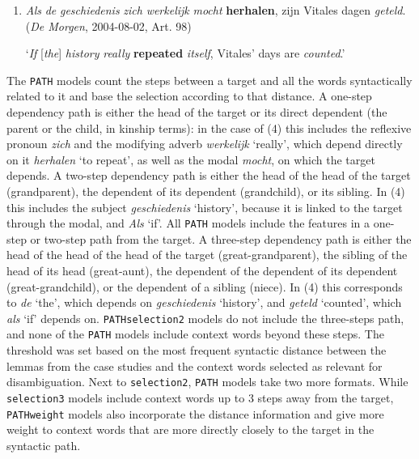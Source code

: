\documentclass[
]{book}
\begin{document}
\begin{enumerate}
\def\labelenumi{(\arabic{enumi})}
\setcounter{enumi}{3}
\item
  \emph{Als} \emph{de} \emph{geschiedenis} \emph{zich} \emph{werkelijk} \emph{mocht} \textbf{herhalen}, zijn Vitales dagen \emph{geteld}. (\emph{De Morgen}, 2004-08-02, Art. 98)

  `\emph{If} {[}\emph{the}{]} \emph{history} \emph{really} \textbf{repeated} \emph{itself}, Vitales' days are \emph{counted}.'
\end{enumerate}

The \texttt{PATH} models count the steps between a target and all the words syntactically related to it and base the selection according to that distance. A one-step dependency path is either the head of the target or its direct dependent (the parent or the child, in kinship terms): in the case of (4) this includes the reflexive pronoun \emph{zich} and the modifying adverb \emph{werkelijk} `really', which depend directly on it \emph{herhalen} `to repeat', as well as the modal \emph{mocht}, on which the target depends.
A two-step dependency path is either the head of the head of the target (grandparent), the dependent of its dependent (grandchild), or its sibling. In (4) this includes the subject \emph{geschiedenis} `history', because it is linked to the target through the modal, and \emph{Als} `if'. All \texttt{PATH} models include the features in a one-step or two-step path from the target.
A three-step dependency path is either the head of the head of the head of the target (great-grandparent), the sibling of the head of its head (great-aunt), the dependent of the dependent of its dependent (great-grandchild), or the dependent of a sibling (niece). In (4) this corresponds to \emph{de} `the', which depends on \emph{geschiedenis} `history', and \emph{geteld} `counted', which \emph{als} `if' depends on. \texttt{PATHselection2} models do not include the three-steps path, and none of the \texttt{PATH} models include context words beyond these steps. The threshold was set based on the most frequent syntactic distance between the lemmas from the case studies and the context words selected as relevant for disambiguation. Next to \texttt{selection2}, \texttt{PATH} models take two more formats. While \texttt{selection3} models include context words up to 3 steps away from the target, \texttt{PATHweight} models also incorporate the distance information and give more weight to context words that are more directly closely to the target in the syntactic path.
\end{document}
